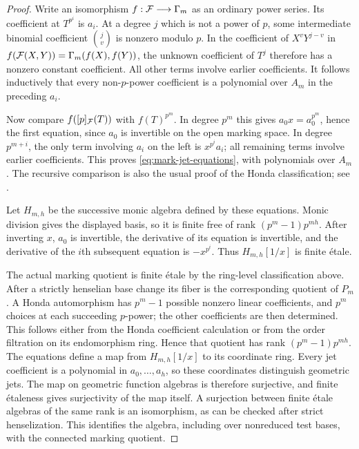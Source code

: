 \begin{proof}
Write an isomorphism $f:\mathcal F\longrightarrow\Gamma_m$ as an ordinary
power series.  Its coefficient at $T^{p^i}$ is $a_i$.  At a degree $j$
which is not a power of $p$, some intermediate binomial coefficient
$\binom{j}{v}$ is nonzero modulo $p$.  In the coefficient of
$X^vY^{j-v}$ in
$f(\mathcal F(X,Y))=\Gamma_m(f(X),f(Y))$, the unknown coefficient of $T^j$
therefore has a nonzero constant coefficient.  All other terms involve
earlier coefficients.  It follows inductively that every non-$p$-power
coefficient is a polynomial over $A_m$ in the preceding $a_i$.

Now compare $f([p]_{\mathcal F}(T))$ with $f(T)^{p^m}$.  In degree $p^m$ this
gives $a_0x=a_0^{p^m}$, hence the first equation, since $a_0$ is
invertible on the open marking space.  In degree $p^{m+i}$, the only
term involving $a_i$ on the left is $x^{p^i}a_i$; all remaining terms
involve earlier coefficients.  This proves
\cref{eq:mark-jet-equations}, with polynomials over $A_m$.  The
recursive comparison is also the usual proof of the Honda
classification; see \citet[Theorem~A2.2.12, its proof, and
Lemmas~A2.2.20--A2.2.21]{ravenel1986}.

Let $H_{m,h}$ be the successive monic algebra defined by these
equations.  Monic division gives the displayed basis, so it is finite
free of rank $(p^m-1)p^{mh}$.  After inverting $x$, $a_0$ is invertible,
the derivative of its equation is invertible, and the derivative of
the $i$th subsequent equation is $-x^{p^i}$.  Thus
$H_{m,h}[1/x]$ is finite \'{e}tale.

The actual marking quotient is finite \'{e}tale by the ring-level
classification above.  After a strictly henselian base change its
fiber is the corresponding quotient of $P_m$.  A Honda automorphism
has $p^m-1$ possible nonzero linear coefficients, and $p^m$ choices at
each succeeding $p$-power; the other coefficients are then determined.
This follows either from the Honda coefficient calculation or from
the order filtration on its endomorphism ring.  Hence that quotient
has rank $(p^m-1)p^{mh}$. The equations define a map from
$H_{m,h}[1/x]$ to its coordinate ring. Every jet coefficient is a
polynomial in $a_0,\ldots,a_h$, so these coordinates distinguish
geometric jets. The map on geometric function algebras is therefore
surjective, and finite \'{e}taleness gives surjectivity of the map
itself. A surjection between finite
\'{e}tale algebras of the same rank is an isomorphism, as can be checked
after strict henselization.  This identifies the algebra, including
over nonreduced test bases, with the connected marking quotient.


\end{proof}
